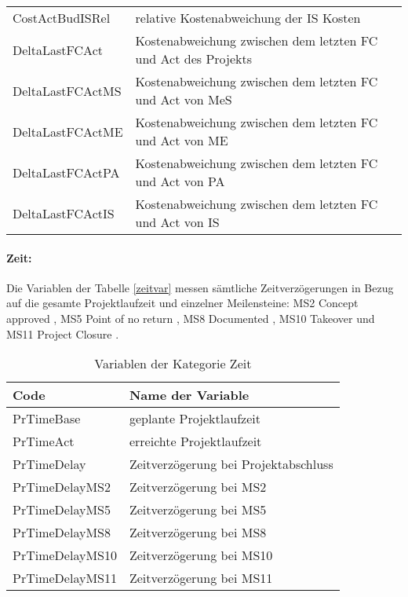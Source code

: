 \begin{table}[htbp]
\begin{tabular}{ll}
		CostActBudISRel & relative Kostenabweichung der IS Kosten \\
		DeltaLastFCAct & Kostenabweichung zwischen dem letzten FC und Act des Projekts \\
		DeltaLastFCActMS & Kostenabweichung zwischen dem letzten FC und Act von MeS \\
		DeltaLastFCActME & Kostenabweichung zwischen dem letzten FC und Act von ME \\
		DeltaLastFCActPA & Kostenabweichung zwischen dem letzten FC und Act von PA \\
		DeltaLastFCActIS & Kostenabweichung zwischen dem letzten FC und Act von IS \\
		\bottomrule
	\end{tabular}%
	\label{tab:addlabel}%
\end{table}%
\paragraph{Zeit:} Die Variablen der Tabelle \ref{zeitvar} messen sämtliche Zeitverzögerungen in Bezug auf die gesamte Projektlaufzeit und einzelner Meilensteine: MS2 \glqq Concept approved \grqq{ }, MS5 \glqq Point of no return \grqq{ }, MS8 \glqq Documented \grqq{ }, MS10 \glqq Takeover\grqq{ } und MS11 \glqq Project Closure \grqq{ }.
\begin{table}[htbp]
	\centering
	\caption{Variablen der Kategorie Zeit}
	\begin{tabular}{ll}
		\toprule
		\textbf{Code} & \textbf{Name der Variable} \\
		\midrule
		PrTimeBase & geplante Projektlaufzeit \\
		PrTimeAct & erreichte Projektlaufzeit \\
		PrTimeDelay & Zeitverzögerung bei Projektabschluss \\
		PrTimeDelayMS2 & Zeitverzögerung bei MS2 \\
		PrTimeDelayMS5 & Zeitverzögerung bei MS5 \\
		PrTimeDelayMS8 & Zeitverzögerung bei MS8 \\
		PrTimeDelayMS10 & Zeitverzögerung bei MS10 \\
		PrTimeDelayMS11 & Zeitverzögerung bei MS11 \\
		\bottomrule
	\end{tabular}%
	\label{tab:zeitvar}%
\end{table}%

